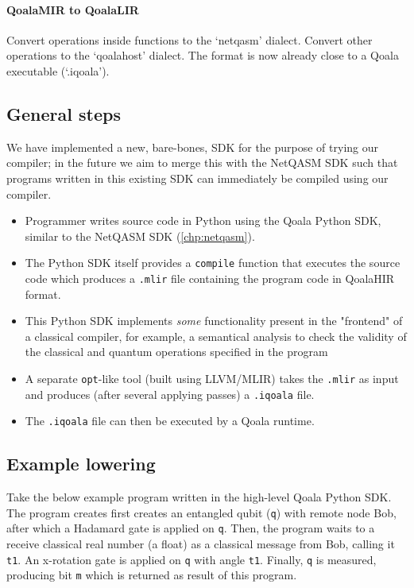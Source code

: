 \paragraph{QoalaMIR to QoalaLIR}
Convert operations inside functions to the `netqasm' dialect.
Convert other operations to the `qoalahost' dialect.
The format is now already close to a Qoala executable (`.iqoala').

\subsection{General steps}
We have implemented a new, bare-bones, SDK for the purpose of trying our compiler; in the future we aim to merge this with the NetQASM SDK such that programs written in this existing SDK can immediately be compiled using our compiler.

\begin{itemize}
\item Programmer writes source code in Python using the Qoala Python SDK, similar to the NetQASM SDK (\cref{chp:netqasm}).
\item The Python SDK itself provides a \texttt{compile} function that executes the source code
  which produces a \texttt{.mlir} file containing the program code in QoalaHIR format.
\item This Python SDK implements \textit{some} functionality present in the "frontend" of a classical
  compiler, for example, a semantical analysis to check the validity of the classical and
  quantum operations specified in the program 
\item A separate \texttt{opt}-like tool (built using LLVM/MLIR) takes the \texttt{.mlir} as input and produces
  (after several applying passes) a \texttt{.iqoala} file.
\item The \texttt{.iqoala} file can then be executed by a Qoala runtime.
\end{itemize}


\subsection{Example lowering}

Take the below example program written in the high-level Qoala Python SDK.
The program creates first creates an entangled qubit (\texttt{q}) with remote node Bob, after which a Hadamard gate is applied on \texttt{q}.
Then, the program waits to a receive classical real number (a float) as a classical message from Bob, calling it \texttt{t1}.
An x-rotation gate is applied on \texttt{q} with angle \texttt{t1}.
Finally, \texttt{q} is measured, producing bit \texttt{m} which is returned as result of this program.


